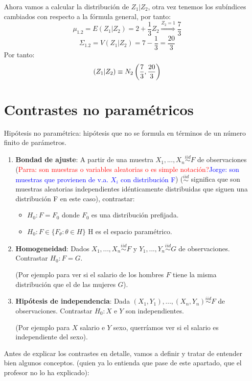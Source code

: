 \documentclass[palatino,nochap]{apuntes}
\begin{document}
\begin{example}
Ahora vamos a calcular la distribución de $Z_1|Z_2$, otra vez tenemos los subíndices cambiados con respecto a la fórmula general, por tanto:
\[
\mu_{1.2}=E(Z_1|Z_2)=2+\frac{1}{3}Z_2 \stackrel{Z_2=1}{\Rightarrow} \frac{7}{3}
\]
\[
\Sigma_{1.2}=V(Z_1|Z_2) = 7-\frac{1}{3} = \frac{20}{3}
\]
Por tanto:
\[
\left(
Z_1|Z_2 \\
\right) \equiv N_2 \left( 
\frac{7}{3}
,  \frac{20}{3} \right)\]

\end{example}

\chapter{Contrastes no paramétricos}
Hipótesis no paramétrica: hipótesis que no se formula en términos de un número finito de parámetros.

\begin{enumerate}
\item \textbf{Bondad de ajuste}: A partir de una muestra $X_1,...,X_n \stackrel{iid}{\sim} F$ de observaciones ({\textcolor{red}{Parra: son muestras o variables aleatorias o es simple notación?}}{\textcolor{blue}{Jorge: son muestras que provienen de v.a. $X_i$ con distribución F}}) ($\stackrel{iid}{\sim}$ significa que son muestras aleatorias independientes idénticamente distribuidas que siguen una distribución F en este caso), contrastar:
\begin{itemize}
\item $H_0: F=F_0$ donde $F_0$ es una distribución prefijada.
\item $H_0: F \in \{F_{\theta} : \theta\in H\}$ H es el espacio paramétrico.
\end{itemize}
\item \textbf{ Homogeneidad}: Dados $X_1,...,X_n \stackrel{iid}{\sim} F$ y $Y_1,...,Y_n \stackrel{iid}{\sim} G$ de observaciones. Contrastar $H_0: F=G$.

(Por ejemplo para ver si el salario de los hombres $F$ tiene la misma distribución que el de las mujeres $G$).

\item \textbf{Hipótesis de independencia}: Dada $(X_1,Y_1),...,(X_n,Y_n) \stackrel{iid}{\sim} F$ de observaciones. Contrastar $H_0: X$ e $Y$ son independientes.

(Por ejemplo para $X$ salario e $Y$ sexo, querríamos ver si el salario es independiente del sexo).
\end{enumerate}

Antes de explicar los contrastes en detalle, vamos a definir y tratar de entender bien algunos conceptos. (quien ya lo entienda que pase de este apartado, que el profesor no lo ha explicado):
\end{document}
